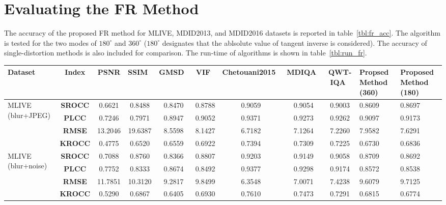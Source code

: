 \section{Evaluating the FR Method}
The accuracy of the proposed FR method for MLIVE, MDID2013, and MDID2016 datasets is reported in table~\ref{tbl:fr_acc}. The algorithm is tested for the two modes of $180^{\circ}$ and $360^{\circ}$ ($180^{\circ}$ designates that the ablsolute value of tangent inverse is considered). The accuracy of single-distortion methods is also included for comparison. The run-time of algorithms is shown in table~\ref{tbl:run_fr}.

\begin{sidewaystable}[htb]
    \caption{The Accuracy of the Proposed Method and Other FR Algorithms}
    \label{tbl:fr_acc}
  \bigskip
    \centering\footnotesize\setlength\tabcolsep{2pt}
        \hspace*{-1cm}\begin{tabular}{m{2cm}|c||c|c|c|c||c|c|c|m{1.2cm}|m{1cm}}
             \textbf{Dataset}&\textbf{Index}&PSNR&SSIM~\cite{Wang2004}&GMSD~\cite{Xue2014}&VIF~\cite{Sheikh2006}&Chetouani2015~\cite{Chetouani2015}&MDIQA~\cite{zhang2019full}&QWT-IQA~\cite{Li2018a}&Propsed Method (360)&Proposed Method (180)\\
             \hline\hline
             \multirow{4}{4em}{MLIVE (blur+JPEG)}&\textbf{SROCC}&0.6621&0.8488&0.8470&0.8788&0.9059&0.9054&0.9003&0.8609&0.8697\\[1ex]
             &\textbf{PLCC}&0.7246&0.7971&0.8947&0.9052&0.9371&0.9273&0.9262&0.9097&0.9173\\[1ex]
             &\textbf{RMSE}&13.2046&19.6387&8.5598&8.1427&6.7182&7.1264&7.2260&7.9582&7.6291\\[1ex]
             &\textbf{KROCC}&0.4775&0.6520&0.6559&0.6922&0.7394&0.7309&0.7225&0.6730&0.6836\\[1ex]
             \hline\hline
             \multirow{4}{4em}{MLIVE (blur+noise)}&\textbf{SROCC}&0.7088&0.8760&0.8366&0.8807&0.9203&0.9149&0.9058&0.8709&0.8692\\[1ex]
             &\textbf{PLCC}&0.7752&0.8333&0.8674&0.8492&0.9377&0.9298&0.9174&0.8572&0.8538\\[1ex]
             &\textbf{RMSE}&11.7851&10.3120&9.2817&9.8499&6.3548&7.0071&7.4238&9.6079&9.7125\\[1ex]
             &\textbf{KROCC}&0.5290&0.6867&0.6405&0.6930&0.7610&0.7473&0.7291&0.6815&0.6774\\[1ex]

\end{tabular}
\end{sidewaystable}

